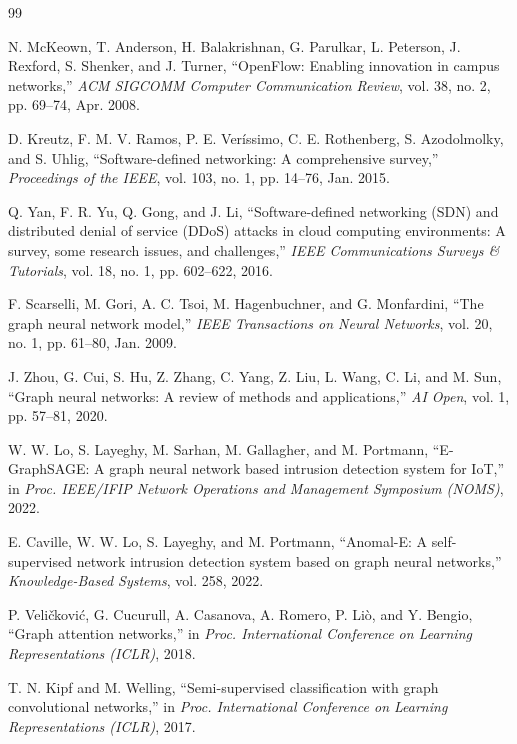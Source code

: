 

\begin{thebibliography}{99}

 N. McKeown, T. Anderson, H. Balakrishnan, G. Parulkar, L. Peterson, J. Rexford, S. Shenker, and J. Turner, ``OpenFlow: Enabling innovation in campus networks,'' \textit{ACM SIGCOMM Computer Communication Review}, vol. 38, no. 2, pp. 69--74, Apr. 2008.

 D. Kreutz, F. M. V. Ramos, P. E. Ver\'{i}ssimo, C. E. Rothenberg, S. Azodolmolky, and S. Uhlig, ``Software-defined networking: A comprehensive survey,'' \textit{Proceedings of the IEEE}, vol. 103, no. 1, pp. 14--76, Jan. 2015.

 Q. Yan, F. R. Yu, Q. Gong, and J. Li, ``Software-defined networking (SDN) and distributed denial of service (DDoS) attacks in cloud computing environments: A survey, some research issues, and challenges,'' \textit{IEEE Communications Surveys \& Tutorials}, vol. 18, no. 1, pp. 602--622, 2016.

 F. Scarselli, M. Gori, A. C. Tsoi, M. Hagenbuchner, and G. Monfardini, ``The graph neural network model,'' \textit{IEEE Transactions on Neural Networks}, vol. 20, no. 1, pp. 61--80, Jan. 2009.

 J. Zhou, G. Cui, S. Hu, Z. Zhang, C. Yang, Z. Liu, L. Wang, C. Li, and M. Sun, ``Graph neural networks: A review of methods and applications,'' \textit{AI Open}, vol. 1, pp. 57--81, 2020.

 W. W. Lo, S. Layeghy, M. Sarhan, M. Gallagher, and M. Portmann, ``E-GraphSAGE: A graph neural network based intrusion detection system for IoT,'' in \textit{Proc. IEEE/IFIP Network Operations and Management Symposium (NOMS)}, 2022.

 E. Caville, W. W. Lo, S. Layeghy, and M. Portmann, ``Anomal-E: A self-supervised network intrusion detection system based on graph neural networks,'' \textit{Knowledge-Based Systems}, vol. 258, 2022.

 P. Veli\v{c}kovi\'{c}, G. Cucurull, A. Casanova, A. Romero, P. Li\`{o}, and Y. Bengio, ``Graph attention networks,'' in \textit{Proc. International Conference on Learning Representations (ICLR)}, 2018.

 T. N. Kipf and M. Welling, ``Semi-supervised classification with graph convolutional networks,'' in \textit{Proc. International Conference on Learning Representations (ICLR)}, 2017.


\end{thebibliography}
